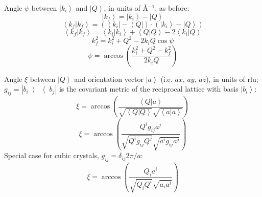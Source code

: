 \documentclass{article}
\begin{document}
Angle $\psi$ between $\left| k_i \right>$ and $\left| Q \right>$, in units of \AA{}$^{-1}$, as before:
\begin{equation} \left| k_f \right> = \left| k_i \right> - \left| Q \right> \end{equation}
\begin{equation} \left< k_f | k_f \right> = \left( \left< k_i \right| - \left< Q \right| \right) \cdot \left( \left| k_i \right> - \left| Q \right> \right) \end{equation}
\begin{equation} \left< k_f | k_f \right> = \left< k_i | k_i \right> + \left< Q | Q \right> - 2 \left< k_i | Q \right> \end{equation}
\begin{equation} k_f^2 = k_i^2 + Q^2 - 2 k_i Q \cos \psi \end{equation}
\begin{equation} \boxed{ \psi = \arccos \left( \frac{k_i^2 + Q^2 - k_f^2}{2 k_i Q} \right) } \end{equation}

Angle $\xi$ between $\left| Q \right>$ and orientation vector $\left| a \right>$ (i.e. $ax$, $ay$, $az$), in units of rlu; $g_{ij} = \left| b_i \left> \right< b_j \right|$ is the covariant metric of the reciprocal lattice with basis $\left| b_i \right>$:
\begin{equation} \xi = \arccos \left( \frac{ \left< Q | a \right> }{ \sqrt{\left< Q | Q \right>} \sqrt{\left< a | a \right>} } \right) \end{equation}
\begin{equation} \boxed{ \xi = \arccos \left( \frac{ Q^i g_{ij} a^j }{ \sqrt{Q^i g_{ij} Q^j} \sqrt{a^i g_{ij} a^j} } \right) } \end{equation}
Special case for cubic crystals, $g_{ij} = \delta_{ij} 2\pi / a$:
\begin{equation} \xi = \arccos \left( \frac{ Q_i a^i }{ \sqrt{Q_i Q^i} \sqrt{a_i a^i} } \right) \end{equation}
\end{document}
